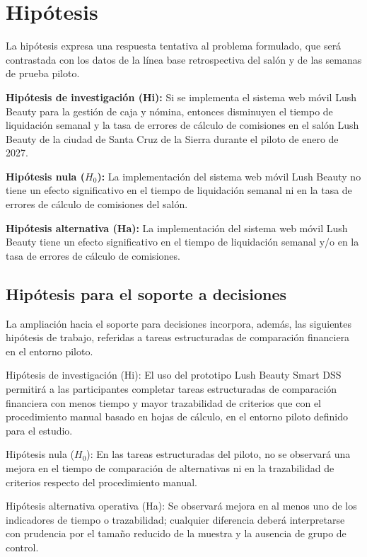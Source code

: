 \section{Hipótesis}\label{cap:hipotesis}

La hipótesis expresa una respuesta tentativa al problema formulado, que será contrastada con los datos de la línea base retrospectiva del salón y de las semanas de prueba piloto.


\textbf{Hipótesis de investigación (Hi):} Si se implementa el sistema web móvil Lush Beauty para la gestión de caja y nómina, entonces disminuyen el tiempo de liquidación semanal y la tasa de errores de cálculo de comisiones en el salón Lush Beauty de la ciudad de Santa Cruz de la Sierra durante el piloto de enero de 2027.


\textbf{Hipótesis nula ($H_0$):} La implementación del sistema web móvil Lush Beauty no tiene un efecto significativo en el tiempo de liquidación semanal ni en la tasa de errores de cálculo de comisiones del salón.


\textbf{Hipótesis alternativa (Ha):} La implementación del sistema web móvil Lush Beauty tiene un efecto significativo en el tiempo de liquidación semanal y/o en la tasa de errores de cálculo de comisiones.


\subsection{Hipótesis para el soporte a decisiones}

La ampliación hacia el soporte para decisiones incorpora, además, las siguientes hipótesis de trabajo, referidas a tareas estructuradas de comparación financiera en el entorno piloto.

Hipótesis de investigación (Hi): El uso del prototipo Lush Beauty Smart DSS permitirá a las participantes completar tareas estructuradas de comparación financiera con menos tiempo y mayor trazabilidad de criterios que con el procedimiento manual basado en hojas de cálculo, en el entorno piloto definido para el estudio.


Hipótesis nula ($H_0$): En las tareas estructuradas del piloto, no se observará una mejora en el tiempo de comparación de alternativas ni en la trazabilidad de criterios respecto del procedimiento manual.


Hipótesis alternativa operativa (Ha): Se observará mejora en al menos uno de los indicadores de tiempo o trazabilidad; cualquier diferencia deberá interpretarse con prudencia por el tamaño reducido de la muestra y la ausencia de grupo de control.

